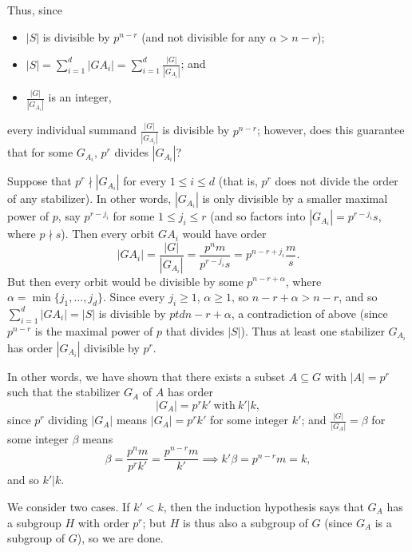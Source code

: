 \documentclass{homework}
\begin{document}
\begin{solution}
  Thus, since
  \begin{itemize}
    \item $\left| S \right| $ is divisible by $p^{n-r}$ (and not divisible for any $\alpha>n-r$);
    \item $\left| S \right| =\sum_{i=1}^{d} \left| GA_i \right| =\sum_{i=1}^{d} \frac{\left| G
      \right| }{\left| G_{A_i} \right| }$; and
    \item $\frac{\left| G \right| }{\left| G_{A_i} \right| }$ is an integer,
  \end{itemize}
  every individual summand $\frac{\left| G \right| }{\left| G_{A_i} \right| }$ is divisible by
  $p^{n-r}$; however, does this guarantee that for some $G_{A_i}$, $p^r$ divides $\left| G_{A_i}
  \right|$?

  Suppose that $p^r\nmid\left| G_{A_i} \right| $ for every $1\le i\le d$ (that is, $p^r$ does not
  divide the order of any stabilizer). In other words, $\left| G_{A_i} \right| $ is only divisible
  by a smaller maximal power of $p$, say $p^{r-j_i}$ for some $1\le j_i\le r$ (and so factors into
  $\left| G_{A_i} \right| =p^{r-j_i}s$, where $p\nmid s$). Then every orbit $GA_i$ would have order
  \[
    \left| GA_i \right| =\frac{\left| G \right| }{\left| G_{A_i}
    \right|}=\frac{p^nm}{p^{r-j_i}s}=p^{n-r+j_i}\frac{m}{s}
  .\] But then every orbit would be divisible by some $p^{n-r+\alpha}$, where
  $\alpha=\min\{j_1,\ldots,j_d\}$. Since every $j_i\ge 1$, $\alpha\ge 1$, so $n-r+\alpha>n-r$, and
  so $\sum_{i=1}^{d} \left| GA_i \right| =\left| S \right|$ is divisible by $ptdn-r+\alpha$, a
  contradiction of above (since $p^{n-r}$ is the maximal power of $p$ that divides $\left| S \right|
  $). Thus at least one stabilizer $G_{A_i}$ has order $\left| G_{A_i} \right|$ divisible by $p^r$.

  In other words, we have shown that there exists a subset $A\subseteq G$ with $\left| A \right|
  =p^r$ such that the stabilizer $G_A$ of $A$ has order \[
    \left| G_A \right| =p^rk' ~\text{with}~k'|k
  ,\] since $p^r$ dividing $\left| G_A \right| $ means $\left| G_A \right| =p^rk'$ for some
  integer $k'$; and $\frac{\left| G \right| }{\left| G_A \right| }=\beta$ for some integer
  $\beta$ means \[
    \beta=\frac{p^nm}{p^rk'}=\frac{p^{n-r}m}{k'}\implies k'\beta=p^{n-r}m=k
  ,\] and so $k'|k$.

  We consider two cases. If $k'<k$, then the induction hypothesis says that $G_A$ has a subgroup
  $H$ with order $p^r$; but $H$ is thus also a subgroup of $G$ (since $G_A$ is a subgroup of $G$),
  so we are done.


\end{solution}
\end{document}
